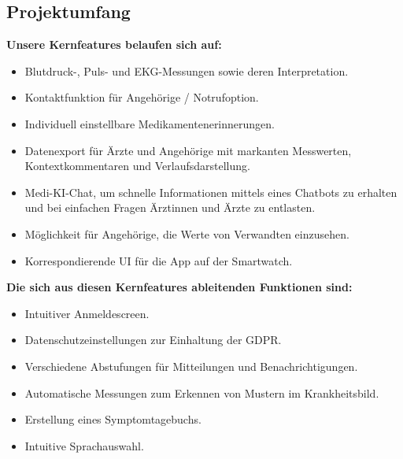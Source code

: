 \subsection{Projektumfang}
\textbf{Unsere Kernfeatures belaufen sich auf:}
\begin{itemize}
	\item Blutdruck-, Puls- und EKG-Messungen sowie deren Interpretation.
	\item Kontaktfunktion für Angehörige / Notrufoption.
	\item Individuell einstellbare Medikamentenerinnerungen.
	\item Datenexport für Ärzte und Angehörige mit markanten Messwerten, Kontextkommentaren und Verlaufsdarstellung.
	\item Medi-KI-Chat, um schnelle Informationen mittels eines Chatbots zu erhalten und bei einfachen Fragen Ärztinnen und Ärzte zu entlasten.
	\item Möglichkeit für Angehörige, die Werte von Verwandten einzusehen.
	\item Korrespondierende UI für die App auf der Smartwatch.
\end{itemize}

\textbf{Die sich aus diesen Kernfeatures ableitenden Funktionen sind:}
\begin{itemize}
	\item Intuitiver Anmeldescreen.
	\item Datenschutzeinstellungen zur Einhaltung der GDPR.
	\item Verschiedene Abstufungen für Mitteilungen und Benachrichtigungen.
	\item Automatische Messungen zum Erkennen von Mustern im Krankheitsbild.
	\item Erstellung eines Symptomtagebuchs.
	\item Intuitive Sprachauswahl.
\end{itemize}

